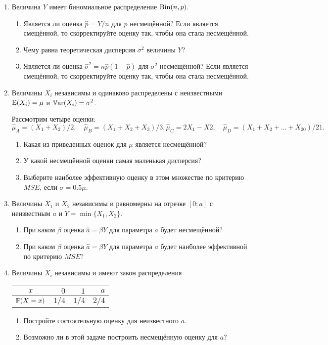 \begin{enumerate}[resume]
\item Величина $Y$ имеет биномиальное распределение $\dBin(n, p)$.
\begin{enumerate}
\item Является ли оценка $\hat p = Y/n$ для $p$ несмещённой? Если является смещённой, то скорректируйте оценку так, чтобы она стала несмещённой.
\item Чему равна теоретическая дисперсия $\sigma^2$ величины $Y$?
\item Является ли оценка $\hat \sigma^2 = n \hat p (1- \hat p)$ для $\sigma^2$ несмещённой? Если является смещённой, то скорректируйте оценку так, чтобы она стала несмещённой.
\end{enumerate}

\item Величины $X_i$ независимы и одинаково распределены с неизвестными $\E(X_i) = \mu$ и $\Var(X_i) = \sigma^2$.

Рассмотрим четыре оценки:
\[
\hat \mu_A = (X_1 + X_2) / 2, \quad \hat\mu_B = (X_1 + X_2 + X_3) / 3,  \hat \mu_C = 2X_1 - X2, 
\quad \hat\mu_D = (X_1 + X_2 + \ldots +  X_{20}) / 21. 
\]

\begin{enumerate}
  \item Какая из приведенных оценок для $\mu$ является несмещённой?
  \item У какой несмещённой оценки самая маленькая дисперсия?
  \item Выберите наиболее эффективную оценку в этом множестве по критерию $MSE$, если $\sigma = 0.5\mu$. 
\end{enumerate}

\item Величины $X_1$ и $X_2$  независимы и равномерны на отрезке $[0;a]$ с неизвестным $a$ и $Y = \min\{ X_1, X_2\}$.

\begin{enumerate}
  \item При каком $\beta$ оценка $\hat a=\beta Y$ для параметра $a$ будет несмещённой?
  \item При каком $\beta$ оценка $\hat a=\beta Y$ для параметра $a$ будет наиболее эффективной по критерию $MSE$?
\end{enumerate}

\item Величины $X_i$ независимы и имеют закон распределения 

\begin{minipage}{\textwidth}
  \begin{tabular}{crrr}
    \toprule
     $x$ & $0$ & $1$ & $a$ \\
    \midrule
    $\P(X = x)$ & $1/4$ & $1/4$ & $2/4$ \\
    \bottomrule
\end{tabular}
\end{minipage}

\begin{enumerate}
    \item Постройте состоятельную оценку для неизвестного $a$.
    \item Возможно ли в этой задаче построить несмещённую оценку для $a$? 
\end{enumerate}


\end{enumerate}

